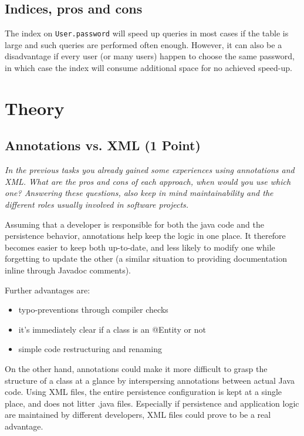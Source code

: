 \documentclass[a4paper,10pt]{article}
\begin{document}
\subsection{Indices, pros and cons}

The index on \lstinline|User.password| will speed up queries in most cases if the table is
large and such queries are performed often enough.
However, it can also be a disadvantage if every user (or many users) happen to choose the same password,
in which case the index will consume additional space for no achieved speed-up.

\section{Theory}

\subsection{Annotations vs. XML (1 Point)}

\emph{In the previous tasks you already gained some experiences using annotations and XML. What are the
pros and cons of each approach, when would you use which one? Answering these questions, also keep
in mind maintainability and the different roles usually involved in software projects.}

\vspace{3mm}

Assuming that a developer is responsible for both the java code and the persistence behavior,
annotations help keep the logic in one place. It therefore becomes easier to keep both
up-to-date, and less likely to modify one while forgetting to update the other (a similar
situation to providing documentation inline through Javadoc comments).

Further advantages are:

\begin{itemize}
\item typo-preventions through compiler checks
\item it's immediately clear if a class is an @Entity or not
\item simple code restructuring and renaming
\end{itemize}

On the other hand, annotations could make it more difficult to grasp the structure of a class
at a glance by interspersing annotations between actual Java code. Using XML files,
the entire persistence configuration is kept at a single place, and does not litter
.java files. Especially if persistence and application logic are maintained by different
developers, XML files could prove to be a real advantage.
\end{document}
